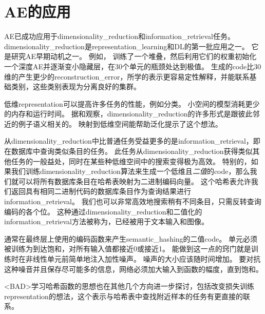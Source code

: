 
\section{\gls{AE}的应用}
\label{sec:applications_of_autoencoders}

\gls{AE}已成功应用于\gls{dimensionality_reduction}和\gls{information_retrieval}任务。
\gls{dimensionality_reduction}是\gls{representation_learning}和\gls{DL}的第一批应用之一。
它是研究\gls{AE}早期动机之一。
例如， \citet{Hinton-Science2006}训练了一个堆叠，然后利用它们的权重初始化一个深度\gls{AE}并逐渐变小隐藏层，在30个单元的瓶颈处达到极值。
生成的\gls{code}比30维的产生更少的\gls{reconstruction_error}，所学的表示更容易定性解释，并能联系基础类别，这些类别表现为分离良好的集群。


低维\gls{representation}可以提高许多任务的性能，例如分类。
小空间的模型消耗更少的内存和运行时间。
据\citet{Salakhutdinov+Hinton2007-small}和\citet{Torralba+Fergus+Weiss-2008}观察，\gls{dimensionality_reduction}的许多形式是跟彼此邻近的例子语义相关的。
映射到低维空间能帮助泛化提示了这个想法。


从\gls{dimensionality_reduction}中比普通任务受益更多的是\gls{information_retrieval}，即在数据库中查询类似条目的任务。
此任务从\gls{dimensionality_reduction}获得类似其他任务的一般益处，同时在某些种低维空间中的搜索变得极为高效。
特别的，如果我们训练\gls{dimensionality_reduction}算法来生成一个低维且\emph{二值}的\gls{code}，那么我们就可以将所有数据库条目在哈希表映射为二进制编码向量。
这个哈希表允许我们返回具有相同二进制代码的数据库条目作为查询结果进行\gls{information_retrieval}。
我们也可以非常高效地搜索稍有不同条目，只需反转查询编码的各个位。
这种通过\gls{dimensionality_reduction}和二值化的\gls{information_retrieval}方法被称为\citep{Salakhutdinov+Hinton2007-small,Salakhutdinov+Geoff-2009}，已经被用于文本输入\citep{Salakhutdinov+Hinton2007-small,Salakhutdinov+Geoff-2009}和图像\citep{Torralba+Fergus+Weiss-2008,WeissTF08,KrizhevskyH11}。


通常在最终层上使用的编码函数来产生\gls{semantic_hashing}的二值\gls{code}。
单元必须被训练为到达饱和，对所有输入值都接近0或接近1。
能做到这一点的窍门就是训练时在非线性单元前简单地注入加性噪声。
噪声的大小应该随时间增加。
要对抗这种噪音并且保存尽可能多的信息，网络必须加大输入到函数的幅度，直到饱和。


<BAD>学习哈希函数的思想也在其他几个方向进一步探讨，包括改变损失训练\gls{representation}的想法，这个表示与哈希表中查找附近样本的任务有更直接的联系\citep{Norouzi+Fleet-ICML2011}。

